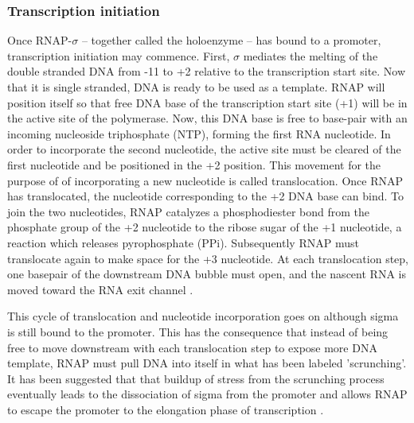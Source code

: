 \subsubsection{Transcription initiation}
Once RNAP-$\sigma$ -- together called the holoenzyme --  has bound to a
promoter, transcription initiation may commence. First, $\sigma$ mediates the
melting of the double stranded DNA from -11 to +2 relative to the transcription
start site. Now that it is single stranded, DNA is ready to be used as a
template. RNAP will position itself so that free DNA base of the transcription
start site (+1) will be in the active site of the polymerase. Now, this DNA
base is free to base-pair with an incoming nucleoside triphosphate (NTP),
forming the first RNA nucleotide. In order to incorporate the second
nucleotide, the active site must be cleared of the first nucleotide and be
positioned in the +2 position. This movement for the purpose of of incorporating a
new nucleotide is called translocation. Once RNAP has translocated, the
nucleotide corresponding to the +2 DNA base can bind. To join the two
nucleotides, RNAP catalyzes a phosphodiester bond from the phosphate group of
the +2 nucleotide to the ribose sugar of the +1 nucleotide, a reaction which
releases pyrophosphate (PPi). Subsequently RNAP must translocate again to make
space for the +3 nucleotide. At each translocation step, one basepair of the
downstream DNA bubble must open, and the nascent RNA is moved toward the RNA
exit channel \cite{o_maoileidigh_unified_2011}.

This cycle of translocation and nucleotide incorporation goes on although sigma
is still bound to the promoter. This has the consequence that instead of being
free to move downstream with each translocation step to expose more DNA
template, RNAP must pull DNA into itself in what has been labeled 'scrunching'.
It has been suggested that that buildup of stress from the scrunching process
eventually leads to the dissociation of sigma from the promoter and allows RNAP
to escape the promoter to the elongation phase of transcription
\cite{revyakin_abortive_2006}.

